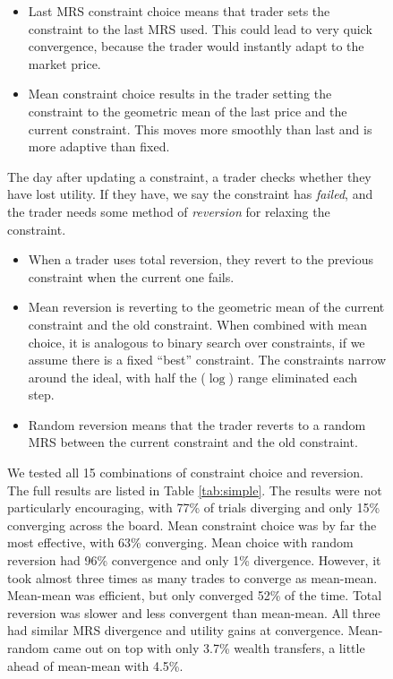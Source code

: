 \documentclass[12pt,a4paper,titlepage]{article}
\newcommand{\co}[1]{\textsf{#1}}
\begin{document}
\begin{figure}[H]
\begin{itemize}
  \item \co{Last} MRS constraint choice means that trader sets the constraint to the last MRS used.
    This could lead to very quick convergence, because the trader would instantly adapt to the market price.

  \item \co{Mean} constraint choice results in the trader setting the constraint to the geometric mean of the last price and the current constraint.
This moves more smoothly than \co{last} and is more adaptive than \co{fixed}.

\end{itemize}

The day after updating a constraint, a trader checks whether they have lost utility.
If they have, we say the constraint has \textit{failed}, and the trader needs some method of \textit{reversion} for relaxing the constraint.

\begin{itemize}

  \item When a trader uses \co{total} reversion, they revert to the previous constraint when the current one fails.

  \item \co{Mean} reversion is reverting to the geometric mean of the current constraint and the old constraint.
When combined with \co{mean} choice, it is analogous to binary search over constraints, if we assume there is a fixed ``best'' constraint.
The constraints narrow around the ideal, with half the ($\log$) range eliminated each step.

  \item \co{Random} reversion means that the trader reverts to a random MRS between the current constraint and the old constraint.

\end{itemize}

We tested all 15 combinations of constraint choice and reversion.
The full results are listed in Table \ref{tab:simple}.
The results were not particularly encouraging, with 77\% of trials diverging and only 15\% converging across the board.
\co{Mean} constraint choice was by far the most effective, with 63\% converging.
\co{Mean} choice with \co{random} reversion had 96\% convergence and only 1\% divergence.
However, it took almost three times as many trades to converge as \co{mean}-\co{mean}.
\co{Mean}-\co{mean} was efficient, but only converged 52\% of the time.
\co{Total} reversion was slower and less convergent than \co{mean}-\co{mean}.
All three had similar MRS divergence and utility gains at convergence.
\co{Mean}-\co{random} came out on top with only 3.7\% wealth transfers, a little ahead of \co{mean}-\co{mean} with 4.5\%.


\end{figure}
\end{document}
